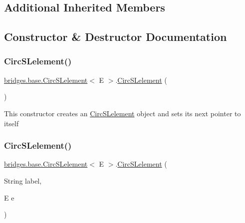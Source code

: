 \subsection*{Additional Inherited Members}


\subsection{Constructor \& Destructor Documentation}
\mbox{\label{classbridges_1_1base_1_1_circ_s_lelement_a4a5a58cc7a0ec5170a828861c11df1b3}} 
\subsubsection{\texorpdfstring{Circ\+S\+Lelement()}{CircSLelement()}\hspace{0.1cm}{\footnotesize\ttfamily [1/4]}}
{\footnotesize\ttfamily \hyperlink{classbridges_1_1base_1_1_circ_s_lelement}{bridges.\+base.\+Circ\+S\+Lelement}$<$ E $>$.\hyperlink{classbridges_1_1base_1_1_circ_s_lelement}{Circ\+S\+Lelement} (\begin{DoxyParamCaption}{ }\end{DoxyParamCaption})}

This constructor creates an \hyperlink{classbridges_1_1base_1_1_circ_s_lelement}{Circ\+S\+Lelement} object and sets its next pointer to itself \mbox{\label{classbridges_1_1base_1_1_circ_s_lelement_a213d61713e51295d756669def911f080}} 
\subsubsection{\texorpdfstring{Circ\+S\+Lelement()}{CircSLelement()}\hspace{0.1cm}{\footnotesize\ttfamily [2/4]}}
{\footnotesize\ttfamily \hyperlink{classbridges_1_1base_1_1_circ_s_lelement}{bridges.\+base.\+Circ\+S\+Lelement}$<$ E $>$.\hyperlink{classbridges_1_1base_1_1_circ_s_lelement}{Circ\+S\+Lelement} (\begin{DoxyParamCaption}\item[{String}]{label,  }\item[{E}]{e }\end{DoxyParamCaption})}


